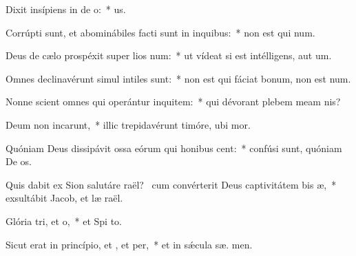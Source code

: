 \item Dixit insípiens in de o:~*   us.
\item Corrúpti sunt, et abominábiles facti sunt in inquibus:~* non est qui  num.
\item Deus de cælo prospéxit super lios num:~* ut vídeat si est intélligens, aut  um.
\item Omnes declinavérunt simul intiles  sunt:~* non est qui fáciat bonum, non est   num.
\item Nonne scient omnes qui operántur inquitem:~* qui dévorant plebem meam   nis?
\item Deum non incarunt,~* illic trepidavérunt timóre, ubi   mor.
\item Quóniam Deus dissipávit ossa eórum qui honibus cent:~* confúsi sunt, quóniam De  os.
\item Quis dabit ex Sion salutáre raël?~\pscross{} cum convérterit Deus captivitátem bis æ,~* exsultábit Jacob, et læ raël.
\item Glória tri, et o,~* et Spi to.
\item Sicut erat in princípio, et , et per,~* et in sǽcula sæ. men.
